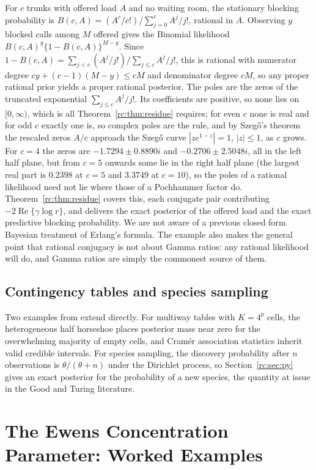 For $c$ trunks with offered load $A$ and no waiting room, the stationary blocking probability is $B(c,A)=(A^c/c!)/\sum_{j=0}^cA^j/j!$, rational in $A$. Observing $y$ blocked calls among $M$ offered gives the Binomial likelihood $B(c,A)^y\{1-B(c,A)\}^{M-y}$. Since $1-B(c,A)=\sum_{j<c}(A^j/j!)/\sum_{j\le c}A^j/j!$, this is rational with numerator degree $cy+(c-1)(M-y)\le cM$ and denominator degree $cM$, so any proper rational prior yields a proper rational posterior. The poles are the zeros of the truncated exponential $\sum_{j\le c}A^j/j!$. Its coefficients are positive, so none lies on $[0,\infty)$, which is all Theorem~\ref{rc:thm:residue} requires; for even $c$ none is real and for odd $c$ exactly one is, so complex poles are the rule, and by Szeg\H{o}'s theorem the rescaled zeros $A/c$ approach the Szeg\H{o} curve $|ze^{1-z}|=1$, $|z|\le1$, as $c$ grows. For $c=4$ the zeros are $-1.7294\pm0.8890i$ and $-0.2706\pm2.5048i$, all in the left half plane, but from $c=5$ onwards some lie in the right half plane (the largest real part is $0.2398$ at $c=5$ and $3.3749$ at $c=10$), so the poles of a rational likelihood need not lie where those of a Pochhammer factor do. Theorem~\ref{rc:thm:residue} covers this, each conjugate pair contributing $-2\operatorname{Re}\{\gamma\log r\}$, and delivers the exact posterior of the offered load and the exact predictive blocking probability. We are not aware of a previous closed form Bayesian treatment of Erlang's formula. The example also makes the general point that rational conjugacy is not about Gamma ratios: any rational likelihood will do, and Gamma ratios are simply the commonest source of them.

\subsection{Contingency tables and species sampling}

Two examples from \citet{rc:wang2024} extend directly. For multiway tables with $K=4^p$ cells, the heterogeneous half horseshoe places posterior mass near zero for the overwhelming majority of empty cells, and Cram\'er association statistics inherit valid credible intervals. For species sampling, the discovery probability after $n$ observations is $\theta/(\theta+n)$ under the Dirichlet process, so Section~\ref{rc:sec:py} gives an exact posterior for the probability of a new species, the quantity at issue in the Good and Turing literature.

\section{The Ewens Concentration Parameter: Worked Examples}\label{rc:sec:genetics}


